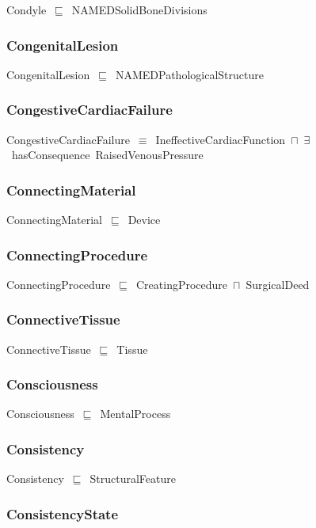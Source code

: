 \documentclass{article}
\begin{document}
Condyle~\ensuremath{\sqsubseteq}~NAMEDSolidBoneDivisions~

\subsubsection*{CongenitalLesion}

CongenitalLesion~\ensuremath{\sqsubseteq}~NAMEDPathologicalStructure~

\subsubsection*{CongestiveCardiacFailure}

CongestiveCardiacFailure~\ensuremath{\equiv}~IneffectiveCardiacFunction~\ensuremath{\sqcap}~\ensuremath{\exists}~hasConsequence~RaisedVenousPressure

\subsubsection*{ConnectingMaterial}

ConnectingMaterial~\ensuremath{\sqsubseteq}~Device~

\subsubsection*{ConnectingProcedure}

ConnectingProcedure~\ensuremath{\sqsubseteq}~CreatingProcedure~\ensuremath{\sqcap}~SurgicalDeed~

\subsubsection*{ConnectiveTissue}

ConnectiveTissue~\ensuremath{\sqsubseteq}~Tissue~

\subsubsection*{Consciousness}

Consciousness~\ensuremath{\sqsubseteq}~MentalProcess~

\subsubsection*{Consistency}

Consistency~\ensuremath{\sqsubseteq}~StructuralFeature~

\subsubsection*{ConsistencyState}
\end{document}
